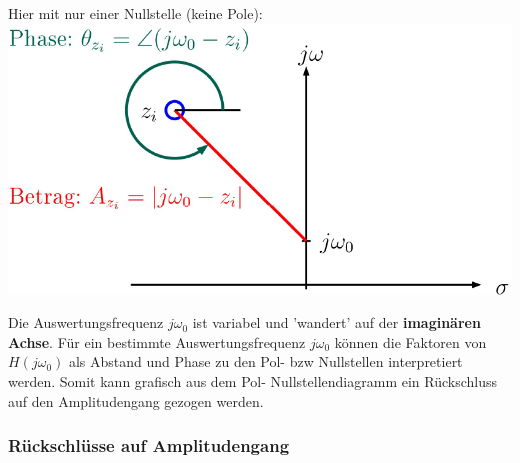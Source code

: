 \begin{minipage}[c]{0.5\columnwidth}
    Hier mit nur einer Nullstelle (keine Pole): 
    \includegraphics[width=\columnwidth]{images/frequenzgang_amplitudengang.png}
\end{minipage}
\hfill
\begin{minipage}[c]{0.48\columnwidth}
    Die Auswertungsfrequenz $j \omega_0$ ist variabel und 'wandert' auf der \textbf{imaginären Achse}.
    Für ein bestimmte Auswertungsfrequenz $j \omega_0$ können die Faktoren von $H(j \omega_0)$ als Abstand und Phase zu den
    Pol- bzw Nullstellen interpretiert werden.
    Somit kann grafisch aus dem Pol- Nullstellendiagramm ein Rückschluss auf den Amplitudengang gezogen werden.
\end{minipage}


\subsubsection{Rückschlüsse auf Amplitudengang}

